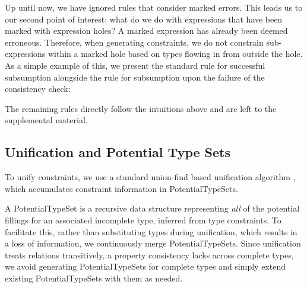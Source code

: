 Up until now, we have ignored rules that consider marked errors. This leads us to our second point of interest: what do we do with expressions that have been marked with expression holes? A marked expression has already been deemed erroneous. Therefore, when generating constraints, we do not constrain sub-expressions within a marked hole based on types flowing in from outside the hole. As a simple example of this, we present the standard rule for successful subsumption alongside the rule for subsumption upon the failure of the consistency check:

\begin{mathpar}
  
\end{mathpar}

The remaining rules directly follow the intuitions above and are left to the supplemental material.

\subsection{Unification and Potential Type Sets}
\label{sec:unification}

To unify constraints, we use a standard union-find based unification algorithm \cite{Huet, GradualInfer}, which accumulates constraint information in \textsf{PotentialTypeSet}s. 

A \textsf{PotentialTypeSet} is a recursive data structure representing \emph{all} of the potential fillings for an associated incomplete type, inferred from type constraints. To facilitate this, rather than  substituting types during unification, which results in a loss of information, we continuously merge \textsf{PotentialTypeSet}s. Since unification treats relations transitively, a property consistency lacks across complete types, we avoid generating \textsf{PotentialTypeSet}s for complete types and simply extend existing \textsf{PotentialTypeSet}s with them as needed.

